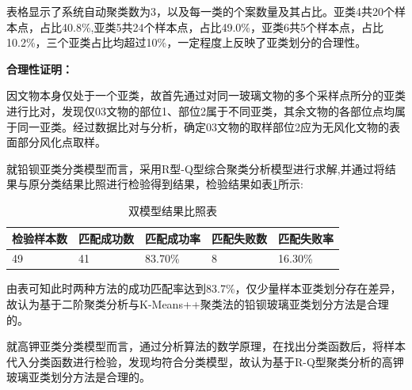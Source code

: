 \documentclass{my_paper}
\begin{document}
表格显示了系统自动聚类数为3，以及每一类的个案数量及其占比。亚类4共20个样本点，占比40.8\%,亚类5共24个样本点，占比49.0\%，亚类6共5个样本点，占比10.2\%，三个亚类占比均超过10\%，一定程度上反映了亚类划分的合理性。\par
\textbf{合理性证明：}\par
因文物本身仅处于一个亚类，故首先通过对同一玻璃文物的多个采样点所分的亚类进行比对，发现仅03文物的部位1、部位2属于不同亚类，其余文物的各部位点均属于同一亚类。经过数据比对与分析，确定03文物的取样部位2应为无风化文物的表面部分风化点取样。\par
就铅钡亚类分类模型而言，采用R型-Q型综合聚类分析模型进行求解,并通过将结果与原分类结果比照进行检验得到结果，检验结果如表\ref{双模型结果比照表}所示:
\begin{table}[H]
    \centering
    \caption{双模型结果比照表}
    \label{双模型结果比照表}
    \begin{tabular}{lllll}
    \hline
        检验样本数 & 匹配成功数 & 匹配成功率 & 匹配失败数 & 匹配失败率 \\ \hline
        49 & 41 & 83.70\% & 8 & 16.30\% \\ \hline
    \end{tabular}
\end{table}

由表可知此时两种方法的成功匹配率达到83.7\%，仅少量样本亚类划分存在差异，故认为基于二阶聚类分析与K-Means++聚类法的铅钡玻璃亚类划分方法是合理的。\par
就高钾亚类分类模型而言，通过分析算法的数学原理，在找出分类函数后，将样本代入分类函数进行检验，发现均符合分类模型，故认为基于R-Q型聚类分析的高钾玻璃亚类划分方法是合理的。
\end{document}
